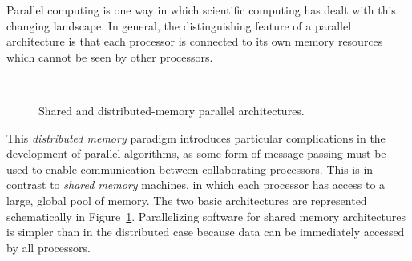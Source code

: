 Parallel computing is one way in which scientific computing has dealt with this changing landscape.  In general, the distinguishing feature of a parallel architecture is that each processor is connected to its own memory resources which cannot be seen by other processors.
\begin{figure}[hbtp]
  \begin{center}
     \\
      \caption{Shared and distributed-memory parallel architectures.\label{fig:shared_dist}}
  \end{center}
\end{figure}
This \emph{distributed memory} paradigm introduces particular complications in the development of parallel algorithms, as some form of message passing must be used to enable communication between collaborating processors.  This is in contrast to \emph{shared memory} machines, in which each processor has access to a large, global pool of memory. The two basic architectures are represented schematically in Figure~\ref{fig:shared_dist}. Parallelizing software for shared memory architectures is simpler than in the distributed case because data can be immediately accessed by all processors.  

